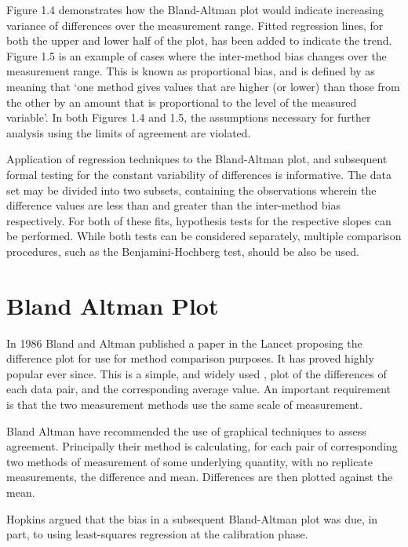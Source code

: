 \documentclass[Main.tex]{subfiles}
\begin{document}
	Figure 1.4 demonstrates how the Bland-Altman plot would indicate
	increasing variance of differences over the measurement range.
	Fitted regression lines, for both the upper and lower half of the
	plot, has been added to indicate the trend. Figure 1.5 is an
	example of cases where the inter-method bias changes over the measurement range. This is known as proportional bias, and is
	defined by \citet{ludbrook97} as meaning that `one method gives	values that are higher (or lower) than those from the other by an
	amount that is proportional to the level of the measured variable'. In both Figures 1.4 and 1.5, the assumptions necessary
	for further analysis using the limits of agreement are violated.
	
Application of regression techniques to the Bland-Altman 
plot, and subsequent formal testing for the constant variability of differences is informative. The data set may be divided into two subsets, containing the observations wherein the difference values are less than and greater than the inter-method bias respectively.
	For both of these fits, hypothesis tests for the respective slopes can be performed. While both tests can be considered separately, multiple comparison procedures, such as the Benjamini-Hochberg
	\citep{BH} test, should be also be used.
	

	



\section{Bland Altman Plot}
In 1986 Bland and Altman published a paper in the Lancet proposing the difference plot for use for method comparison purposes. It has
proved highly popular ever since. This is a simple, and widely used , plot of the differences of each data pair, and the
	corresponding average value. An important requirement is that the two measurement methods use the same scale of measurement.
	
Bland Altman have
recommended the use of graphical techniques to assess agreement.
Principally their method is calculating, for each pair of corresponding two methods of measurement of some underlying quantity, with no replicate measurements, the difference and mean. Differences are then plotted against the mean.

Hopkins argued that the bias in a subsequent Bland-Altman plot was
due, in part, to using least-squares regression at the calibration
phase.
\end{document}
